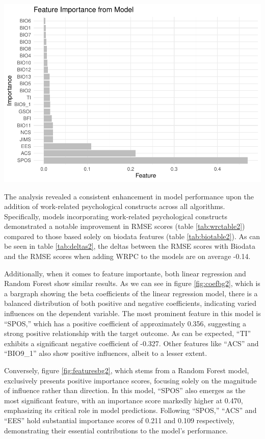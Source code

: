 \documentclass[
  man]{apa7}
\begin{document}
\includegraphics{dissertation_files/figure-latex/featuresbg2-1.pdf}

The analysis revealed a consistent enhancement in model performance upon the addition of work-related psychological constructs across all algorithms. Specifically, models incorporating work-related psychological constructs demonstrated a notable improvement in RMSE scores (table \ref{tab:wrctable2}) compared to those based solely on biodata features (table \ref{tab:biotable2}). As can be seen in table \ref{tab:deltas2}, the deltas between the RMSE scores with Biodata and the RMSE scores when adding WRPC to the models are on average -0.14.

Additionally, when it comes to feature importante, both linear regression and Random Forest show similar results. As we can see in figure \ref{fig:coefbg2}, which is a bargraph showing the beta coefficients of the linear regression model, there is a balanced distribution of both positive and negative coefficients, indicating varied influences on the dependent variable. The most prominent feature in this model is ``SPOS,'' which has a positive coefficient of approximately 0.356, suggesting a strong positive relationship with the target outcome. As can be expected, ``TI'' exhibits a significant negative coefficient of -0.327. Other features like ``ACS'' and ``BIO9\_1'' also show positive influences, albeit to a lesser extent.

Conversely, figure \ref{fig:featuresbg2}, which stems from a Random Forest model, exclusively presents positive importance scores, focusing solely on the magnitude of influence rather than direction. In this model, ``SPOS'' also emerges as the most significant feature, with an importance score markedly higher at 0.470, emphasizing its critical role in model predictions. Following ``SPOS,'' ``ACS'' and ``EES'' hold substantial importance scores of 0.211 and 0.109 respectively, demonstrating their essential contributions to the model's performance.
\end{document}
